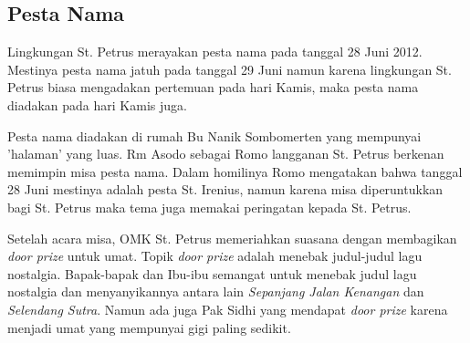 
\subsection*{Pesta Nama}
Lingkungan St. Petrus merayakan pesta nama pada tanggal 28 Juni 2012. Mestinya pesta nama jatuh pada tanggal 29 Juni namun karena lingkungan St. Petrus biasa mengadakan pertemuan pada hari Kamis, maka pesta nama diadakan pada hari Kamis juga.

Pesta nama diadakan di rumah Bu Nanik Sombomerten yang mempunyai 'halaman' yang luas. Rm Asodo sebagai Romo langganan St. Petrus berkenan memimpin misa pesta nama. Dalam homilinya Romo mengatakan bahwa tanggal 28 Juni mestinya adalah pesta St. Irenius, namun karena misa diperuntukkan bagi St. Petrus maka tema juga memakai peringatan kepada St. Petrus.

Setelah acara misa, OMK St. Petrus memeriahkan suasana dengan membagikan \textit{door prize} untuk umat. Topik \textit{door prize} adalah menebak judul-judul lagu nostalgia. Bapak-bapak dan Ibu-ibu semangat untuk menebak judul lagu nostalgia dan menyanyikannya antara lain \textit{Sepanjang Jalan Kenangan} dan \textit{Selendang Sutra}. Namun ada juga Pak Sidhi yang mendapat \textit{door prize} karena menjadi umat yang mempunyai gigi paling sedikit. 